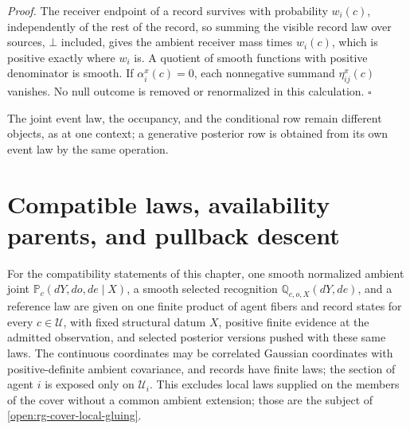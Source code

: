 \noindent\emph{Proof.}
The receiver endpoint of a record survives with probability \(w_i(c)\),
independently of the rest of the record, so summing the visible record law over
sources, \(\bot\) included, gives the ambient receiver mass times \(w_i(c)\),
which is positive exactly where \(w_i\) is. A quotient of smooth functions with
positive denominator is smooth. If \(\alpha_i^x(c)=0\), each nonnegative summand
\(\eta^x_{ij}(c)\) vanishes. No null outcome is removed or renormalized in this
calculation. \(\square\)

The joint event law, the occupancy, and the conditional row remain different
objects, as at one context; a generative posterior row is obtained from its own
event law by the same operation.

\section{Compatible laws, availability parents, and pullback descent}
\label{sec:rg-cover-law-descent}

For the compatibility statements of this chapter, one smooth normalized ambient
joint
\(\mathbb P_c(dY,do,de\mid X)\), a smooth selected recognition
\(\mathbb Q_{c,o,X}(dY,de)\), and a reference law are given on one finite product
of agent fibers and record states for every \(c\in\mathcal U\), with fixed
structural datum \(X\), positive finite evidence at the admitted observation, and
selected posterior versions pushed with these same laws. The continuous
coordinates may be correlated Gaussian coordinates with positive-definite ambient
covariance, and records have finite laws; the section of agent \(i\) is exposed
only on \(\mathcal U_i\). This excludes local laws supplied on the members of the
cover without a common ambient extension; those are the subject of
\cref{open:rg-cover-local-gluing}.

